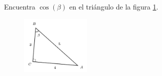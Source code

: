 Encuentra $\cos(\beta)$ en el triángulo de la figura \ref{fig:functrig07}.
\begin{figure}[H]
    \begin{center}
        \includegraphics[width=0.3\textwidth]{../images/functrig07.png}
    \end{center}
    \caption{}
    \label{fig:functrig07}
\end{figure}
